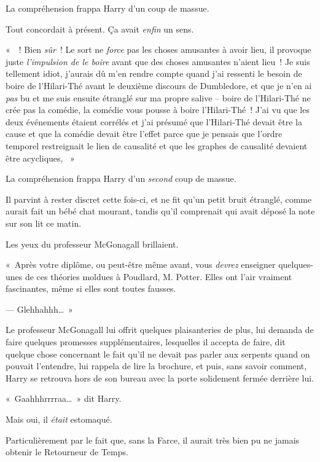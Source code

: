 La compréhension frappa Harry d'un coup de massue.

Tout concordait à présent. Ça avait \emph{enfin} un sens.

«~~! Bien \emph{sûr}~! Le sort ne \emph{force} pas les choses amusantes à avoir lieu, il provoque juste \emph{l'impulsion de le boire} avant que des choses amusantes n'aient lieu~! Je suis tellement idiot, j'aurais dû m'en rendre compte quand j'ai ressenti le besoin de boire de l'Hilari-Thé avant le deuxième discours de Dumbledore, et que je n'en ai \emph{pas} bu et me suis ensuite étranglé sur ma propre salive -- boire de l'Hilari-Thé ne crée pas la comédie, la comédie vous pousse à boire l'Hilari-Thé~! J'ai vu que les deux événements étaient corrélés et j'ai présumé que l'Hilari-Thé devait être la cause et que la comédie devait être l'effet parce que je pensais que l'ordre temporel restreignait le lien de causalité et que les graphes de causalité devaient être acycliques, ~»

La compréhension frappa Harry d'un \emph{second} coup de massue.

Il parvint à rester discret cette fois-ci, et ne fit qu'un petit bruit étranglé, comme aurait fait un bébé chat mourant, tandis qu'il comprenait qui avait déposé la note sur son lit ce matin.

Les yeux du professeur McGonagall brillaient.

«~Après votre diplôme, ou peut-être même avant, vous \emph{devrez} enseigner quelques-unes de ces théories moldues à Poudlard, M. Potter. Elles ont l'air vraiment fascinantes, même si elles sont toutes fausses.

--- Glehhahhh…~»

Le professeur McGonagall lui offrit quelques plaisanteries de plus, lui demanda de faire quelques promesses supplémentaires, lesquelles il accepta de faire, dit quelque chose concernant le fait qu'il ne devait pas parler aux serpents quand on pouvait l'entendre, lui rappela de lire la brochure, et puis, sans savoir comment, Harry se retrouva hors de son bureau avec la porte solidement fermée derrière lui.

«~Gaahhhrrrraa…~» dit Harry.

Mais oui, il \emph{était} estomaqué.

Particulièrement par le fait que, sans la Farce, il aurait très bien pu ne jamais obtenir le Retourneur de Temps.

